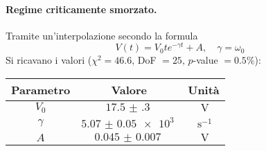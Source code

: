 \documentclass[a4paper]{article}
\begin{document}
\paragraph{Regime criticamente smorzato.}
Tramite un'interpolazione secondo la formula
\[
V(t)=V_0 t e^{-\gamma t}+A,\quad \gamma=\omega_0
\] 
Si ricavano i valori ($\chi^2=46.6$, DoF $=25$, $p$-value $=0.5\%$):
\begin{center}
\begin{tabular}[t]{c|c|c}
	Parametro & Valore & Unità \\\midrule
	$V_0$ & $\SI{17.5(3)}{}$ & $\SI{}{\V}$\\
	$\gamma$ & $\SI{5.07(5)e+3}{}$ & $\SI{}{\s^{-1}}$\\
	$A$ & $\SI{0.045(7)}{}$ & $\SI{}{\V}$
\end{tabular}
\end{center}
\end{document}
